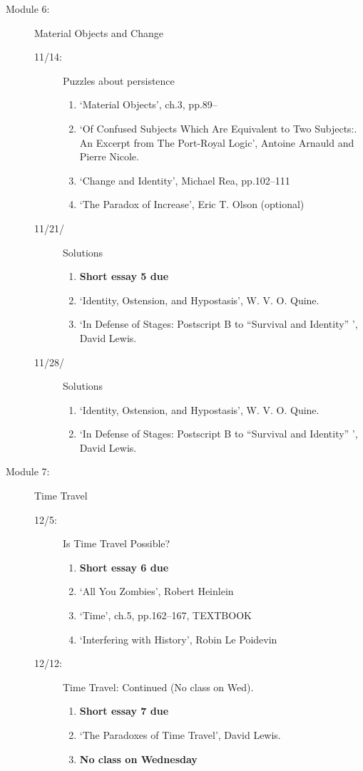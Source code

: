 \documentclass[article,oneside]{memoir}
\begin{document}
\begin{description}
\item[Module 6:] Material Objects and Change
\begin{description}
\item[11/14:] Puzzles about persistence
\begin{enumerate}
\item `Material Objects', ch.3, pp.89--
\item `Of Confused Subjects Which Are Equivalent to Two Subjects:. An Excerpt from The Port-Royal Logic', Antoine Arnauld and Pierre Nicole. 
\item `Change and Identity', Michael Rea, pp.102--111 
\item `The Paradox of Increase', Eric T. Olson (optional)
\end{enumerate}
\item[11/21/] Solutions
\begin{enumerate}
\item \textbf{Short essay 5 due}
\item `Identity, Ostension, and Hypostasis', W. V. O. Quine.
\item `In Defense of Stages: Postscript B to ``Survival and Identity'' ', David Lewis.
\end{enumerate}
\item[11/28/] Solutions
\begin{enumerate}
 \item `Identity, Ostension, and Hypostasis', W. V. O. Quine.
\item `In Defense of Stages: Postscript B to ``Survival and Identity'' ', David Lewis.
\end{enumerate}
\end{description}
\item[Module 7:] Time Travel
\begin{description}
\item[12/5:] Is Time Travel Possible?
\begin{enumerate}
\item \textbf{Short essay 6 due}
\item `All You Zombies', Robert Heinlein 
\item `Time', ch.5, pp.162--167, TEXTBOOK
\item `Interfering with History', Robin Le Poidevin 
\end{enumerate}

\item[12/12:] Time Travel: Continued (No class on Wed).
\begin{enumerate}
\item \textbf{Short essay 7 due}
\item `The Paradoxes of Time Travel', David Lewis.
\item \textbf{No class on Wednesday}
\end{enumerate}


\end{description}
\end{description}
\end{document}
